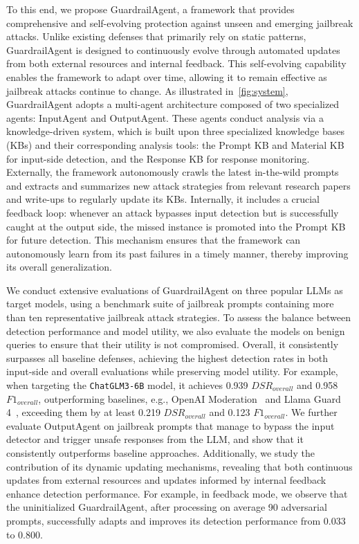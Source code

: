 \documentclass[letterpaper,twocolumn,10pt]{article}
\newcommand{\agentname}{GuardrailAgent\xspace}
\newcommand{\inputagent}{InputAgent\xspace}
\newcommand{\outputagent}{OutputAgent\xspace}
\newcommand{\dsro}{$DSR_{overall}$\xspace}
\newcommand{\foneo}{$F1_{overall}$\xspace}
\begin{document}
To this end, we propose \agentname, a framework that provides comprehensive and self-evolving protection against unseen and emerging jailbreak attacks.
Unlike existing defenses that primarily rely on static patterns, \agentname is designed to continuously evolve through automated updates from both external resources and internal feedback.
This self-evolving capability enables the framework to adapt over time, allowing it to remain effective as jailbreak attacks continue to change.
As illustrated in~\autoref{fig:system}, \agentname adopts a multi-agent architecture composed of two specialized agents: \inputagent and \outputagent.
These agents conduct analysis via a knowledge-driven system, which is built upon three specialized knowledge bases (KBs) and their corresponding analysis tools: the Prompt KB and Material KB for input-side detection, and the Response KB for response monitoring.
Externally, the framework autonomously crawls the latest in-the-wild prompts and extracts and summarizes new attack strategies from relevant research papers and write-ups to regularly update its KBs.
Internally, it includes a crucial feedback loop: whenever an attack bypasses input detection but is successfully caught at the output side, the missed instance is promoted into the Prompt KB for future detection.
This mechanism ensures that the framework can autonomously learn from its past failures in a timely manner, thereby improving its overall generalization.

We conduct extensive evaluations of \agentname on three popular LLMs as target models, using a benchmark suite of jailbreak prompts containing more than ten representative jailbreak attack strategies.
To assess the balance between detection performance and model utility, we also evaluate the models on benign queries to ensure that their utility is not compromised.
Overall, it consistently surpasses all baseline defenses, achieving the highest detection rates in both input-side and overall evaluations while preserving model utility.
For example, when targeting the \texttt{ChatGLM3-6B} model, it achieves 0.939 \dsro and 0.958 \foneo, outperforming baselines, e.g., OpenAI Moderation~\cite{OpenAI_Moderation2} and Llama Guard 4~\cite{IUCRIMTHFTK23,Llama_Guard_2,llama_guard_3,llama_guard4}, exceeding them by at least 0.219 \dsro and 0.123 \foneo.
We further evaluate \outputagent on jailbreak prompts that manage to bypass the input detector and trigger unsafe responses from the LLM, and show that it consistently outperforms baseline approaches.
Additionally, we study the contribution of its dynamic updating mechanisms, revealing that both continuous updates from external resources and updates informed by internal feedback enhance detection performance.
For example, in feedback mode, we observe that the uninitialized \agentname, after processing on average 90 adversarial prompts, successfully adapts and improves its detection performance from 0.033 to 0.800.
\end{document}
